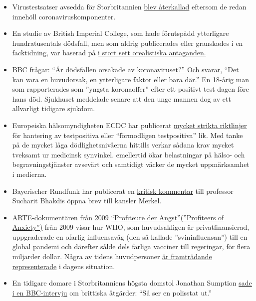 \begin{itemize}
\tightlist
\item
  Virustestsatser avsedda för Storbritannien
  \href{https://www.telegraph.co.uk/news/2020/03/30/uks-attempt-ramp-coronavirus-testing-hindered-key-components/}{blev
  återkallad} eftersom de redan innehöll coronaviruskomponenter.
\item
  En studie av British Imperial College, som hade förutspådd ytterligare
  hundratusentals dödsfall, men som aldrig publicerades eller granskades
  i en facktidning, var baserad på
  \href{https://judithcurry.com/2020/04/01/imperial-college-uk-covid-19-numbers-dont-seem-to-add-up/}{i
  stort sett orealistiska antaganden.}
\item
  BBC frågar: \href{https://www.bbc.com/news/health-51979654}{``Är
  dödsfallen orsakade av koronaviruset?''} Och svarar, ``Det kan vara en
  huvudorsak, en ytterligare faktor eller bara där.'' En 18-årig man som
  rapporterades som ''yngsta koronaoffer'' efter ett positivt test dagen
  före hans död. Sjukhuset meddelade senare att den unge mannen dog av
  ett allvarligt tidigare sjukdom.
\item
  Europeiska hälsomyndigheten ECDC har publicerat
  \href{https://www.ecdc.europa.eu/sites/default/files/documents/COVID-19-safe-handling-of-bodies-or-persons-dying-from-COVID19.pdf}{mycket
  strikta riktlinjer} för hantering av testpositiva eller ``förmodligen
  testpositiva'' lik. Med tanke på de mycket låga dödlighetsnivåerna
  hittills verkar sådana krav mycket tveksamt ur medicinsk synvinkel.
  emellertid ökar belastningar på hälso- och begravningstjänster
  avsevärt och samtidigt väcker de mycket uppmärksamhet i medierna.
\item
  Bayerischer Rundfunk har publicerat en
  \href{https://www.br.de/nachrichten/wissen/bhakdis-brief-an-die-kanzlerin-was-ist-dran-an-seinen-fragen,RutYDhd}{kritisk
  kommentar} till professor Sucharit Bhakdis öppna brev till kansler
  Merkel.
\item
  ARTE-dokumentären från 2009
  \href{https://vimeo.com/403175258}{``Profiteure der
  Angst''(''Profiteers of Anxiety'')} från 2009 visar hur WHO, som
  huvudsakligen är privatfinansierad, uppgraderade en ofarlig
  influensavåg (den så kallade ''svininfluensan'') till en global
  pandemi och därefter sålde dels farliga vacciner till regeringar, för
  flera miljarder dollar. Några av tidens huvudpersoner
  \href{https://www.nature.com/articles/news.2009.424}{är framträdande
  representerade} i dagens situation.
\item
  En tidigare domare i Storbritanniens högsta domstol Jonathan Sumption
  \href{https://www.spectator.co.uk/article/former-supreme-court-justice-this-is-what-a-police-state-is-like-}{sade
  i en BBC-intervju} om brittiska åtgärder: ``Så ser en polisstat ut.''
\end{itemize}

